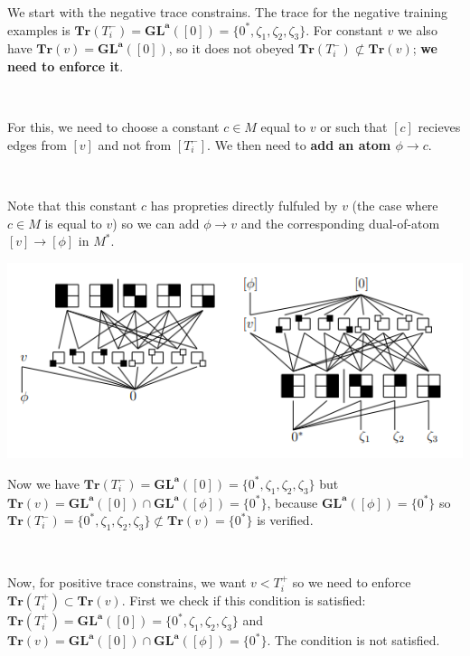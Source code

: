 \documentclass[a4paper, 11pt]{article}
\begin{document}
We start with the negative trace constrains. The trace for the negative training examples is
$\textbf{Tr}(T_i^-) = \boldsymbol{GL}^{\boldsymbol{a}}([0]) = \{0^{\ast}, \zeta_1, \zeta_2, \zeta_3\}$. For constant $v$ we also have $\textbf{Tr}(v) = \boldsymbol{GL}^{\boldsymbol{a}}([0])$, so it does not obeyed $\textbf{Tr}(T_i^-) \not\subset \textbf{Tr}(v)$; \textbf{we need to enforce it}.

\

For this, we need to choose a constant $c \in M$ equal to $v$ or such that $[c]$ recieves edges from $[v]$ and not from $[T_i^-]$. We then need to \textbf{add an atom $\phi \rightarrow c$}. 

\

Note that this constant $c$ has propreties directly fulfuled by $v$ (the case where $c \in M$ is equal to $v$) so we can add $\phi \rightarrow v$ and the corresponding dual-of-atom $[v] \rightarrow [\phi]$ in $M^{\ast}$.

\begin{center}
    \includegraphics[scale = 0.7]{newatom.png}
\end{center}

Now we have $\textbf{Tr}(T_i^-) = \boldsymbol{GL}^{\boldsymbol{a}}([0]) = \{0^{\ast}, \zeta_1, \zeta_2, \zeta_3\}$ but $\textbf{Tr}(v) = \boldsymbol{GL}^{\boldsymbol{a}}([0]) \cap \boldsymbol{GL}^{\boldsymbol{a}}([\phi]) = \{ 0^{\ast} \}$, because $\boldsymbol{GL}^{\boldsymbol{a}}([\phi]) = \{ 0^{\ast} \}$ so $\textbf{Tr}(T_i^-) = \{0^{\ast}, \zeta_1, \zeta_2, \zeta_3\} \not\subset \textbf{Tr}(v) = \{ 0^{\ast} \}$ is verified.

\

Now, for positive trace constrains, we want $v < T_i^+$ so we need to enforce $\textbf{Tr}(T_i^+) \subset \textbf{Tr}(v)$. First we check if this condition is satisfied: $\textbf{Tr}(T_i^+) = \boldsymbol{GL}^{\boldsymbol{a}}([0]) = \{0^{\ast}, \zeta_1, \zeta_2, \zeta_3\}$ and $\textbf{Tr}(v) = \boldsymbol{GL}^{\boldsymbol{a}}([0]) \cap \boldsymbol{GL}^{\boldsymbol{a}}([\phi]) = \{ 0^{\ast} \}$. The condition is not satisfied.
\end{document}
